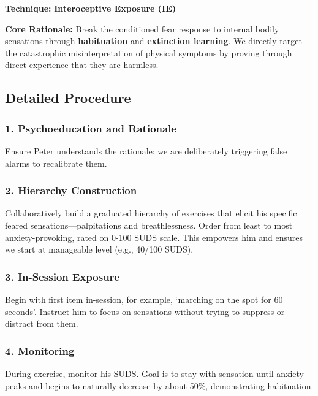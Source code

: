 \documentclass[
  american,
  11pt,
  11pt,
  letterpaper,
  onecolumn]{article}
\begin{document}
\textbf{Technique:} \textbf{Interoceptive Exposure (IE)}

\textbf{Core Rationale:} Break the conditioned fear response to internal
bodily sensations through \textbf{habituation} and \textbf{extinction
learning}. We directly target the catastrophic misinterpretation of
physical symptoms by proving through direct experience that they are
harmless.

\subsection{Detailed Procedure}\label{detailed-procedure}

\subsubsection{1. Psychoeducation and
Rationale}\label{psychoeducation-and-rationale}

Ensure Peter understands the rationale: we are deliberately triggering
false alarms to recalibrate them.

\subsubsection{2. Hierarchy Construction}\label{hierarchy-construction}

Collaboratively build a graduated hierarchy of exercises that elicit his
specific feared sensations---palpitations and breathlessness. Order from
least to most anxiety-provoking, rated on 0-100 SUDS scale. This
empowers him and ensures we start at manageable level (e.g., 40/100
SUDS).

\subsubsection{3. In-Session Exposure}\label{in-session-exposure}

Begin with first item in-session, for example, `marching on the spot for
60 seconds'. Instruct him to focus on sensations without trying to
suppress or distract from them.

\subsubsection{4. Monitoring}\label{monitoring}

During exercise, monitor his SUDS. Goal is to stay with sensation until
anxiety peaks and begins to naturally decrease by about 50\%,
demonstrating habituation.
\end{document}
